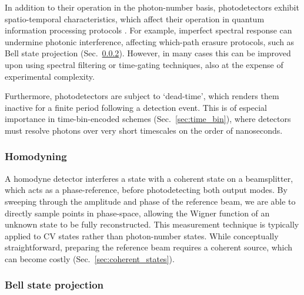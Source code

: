 \documentclass[aps,rmp,twocolumn,amsmath,amssymb,nofootinbib,superscriptaddress,longbibliography,floatfix]{revtex4-1}
\begin{document}
In addition to their operation in the photon-number basis, photodetectors exhibit spatio-temporal characteristics, which affect their operation in quantum information processing protocols \cite{RohdePDReview}. For example, imperfect spectral response can undermine photonic interference, affecting which-path erasure protocols, such as Bell state projection (Sec.~\ref{sec:bell_proj}). However, in many cases this can be improved upon using spectral filtering or time-gating techniques, also at the expense of experimental complexity.

Furthermore, photodetectors are subject to `dead-time', which renders them inactive for a finite period following a detection event. This is of especial importance in time-bin-encoded schemes (Sec.~\ref{sec:time_bin}), where detectors must resolve photons over very short timescales on the order of nanoseconds.

%
%

\subsubsection{Homodyning} \label{sec:homodyne}

A homodyne detector interferes a state with a coherent state on a beamsplitter, which acts as a phase-reference, before photodetecting both output modes. By sweeping through the amplitude and phase of the reference beam, we are able to directly sample points in phase-space, allowing the Wigner function of an unknown state to be fully reconstructed. This measurement technique is typically applied to CV states rather than photon-number states. While conceptually straightforward, preparing the reference beam requires a coherent source, which can become costly (Sec.~\ref{sec:coherent_states}).

%
%

\subsubsection{Bell state projection} \label{sec:bell_proj}
\end{document}

